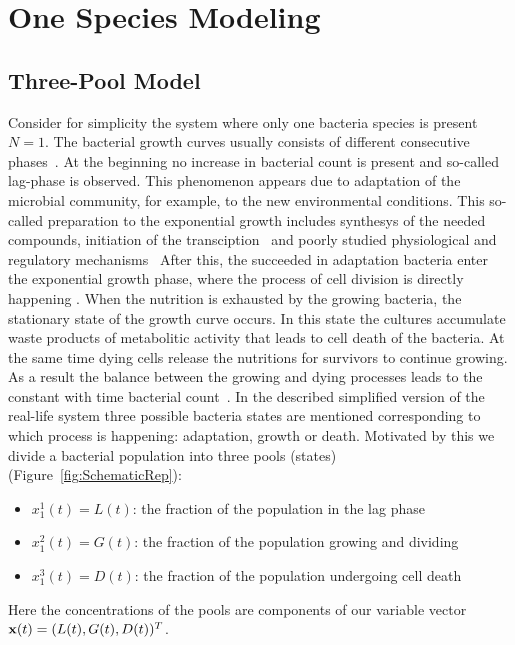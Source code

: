 \documentclass[10pt,A4paper]{article}
\begin{document}
\section{One Species Modeling}
\subsection{Three-Pool Model}
Consider for simplicity the system where only one bacteria species is present $N=1$.
The bacterial growth curves usually consists of different consecutive phases~\cite{buchanan_when_1997}.
At the beginning no increase in bacterial count is present and so-called lag-phase is observed.
This phenomenon appears due to adaptation of the microbial community, for example, to the new environmental conditions.
This so-called preparation to the exponential growth includes synthesys of the needed compounds, initiation of the transciption~\cite{rolfe_lag_2012} and poorly studied physiological and regulatory mechanisms~\cite{monod_growth_1949}
After this, the succeeded in adaptation bacteria enter the exponential growth phase, where the process of cell division is directly happening .
When the nutrition is exhausted by the growing bacteria, the stationary state of the growth curve occurs.
In this state the cultures accumulate waste products of metabolitic activity that leads to cell death of the bacteria.
At the same time dying cells release the nutritions for survivors to continue growing.
As a result the balance between the growing and dying processes leads to the constant with time bacterial count~\cite{navarro_llorens_stationary_2010}.
In the described simplified version of the real-life system three possible bacteria states are mentioned corresponding to which process is happening: adaptation, growth or death.
Motivated by this we divide a bacterial population into three pools (states) (Figure~\ref{fig:SchematicRep}): 
\begin{itemize}
\item $x^1_1 (t) = L(t)$: the fraction of the population in the lag phase
\item $x^2_1 (t) = G(t)$: the fraction of the population growing and dividing
\item $x^3_1 (t) = D(t)$: the fraction of the population undergoing cell death
\end{itemize}
Here the concentrations of the pools are components of our variable vector $\mathbf{x} (t) = (L(t), G(t), D(t))^T$.
\end{document}
